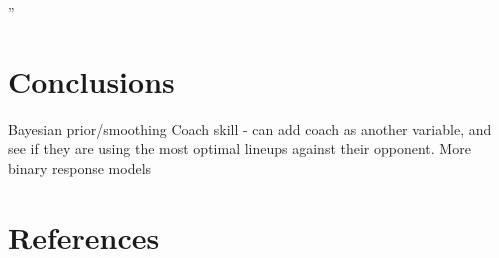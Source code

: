 \documentclass[10pt,twocolumn]{article}
\begin{document}
''

\section{Conclusions}

Bayesian prior/smoothing
Coach skill - can add coach as another variable, and see if they are using the most optimal lineups against their opponent.
More binary response models

\section{References}


%
\end{document}
